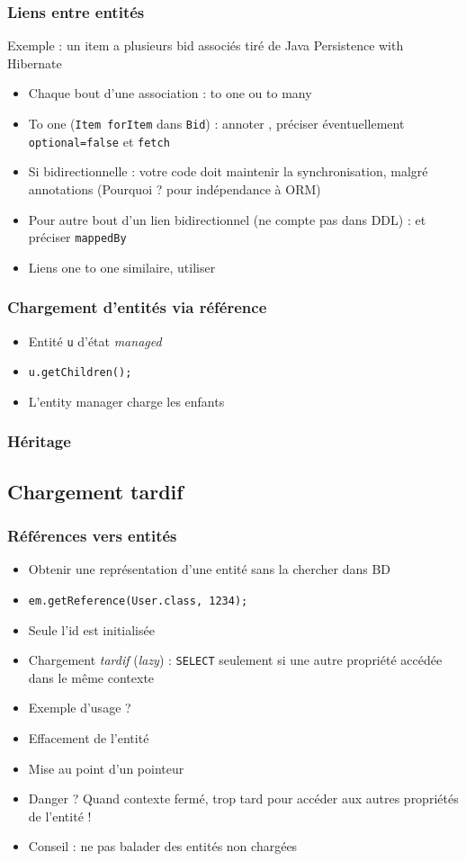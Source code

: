 \documentclass[english, french]{beamer}
\begin{document}
\begin{frame}
	\frametitle{Liens entre entités}
	Exemple : un item a plusieurs bid associés {\tiny tiré de Java Persistence with Hibernate}
	\begin{itemize}
		\item Chaque bout d’une association : to one ou to many
		\item To one (\texttt{Item forItem} dans \texttt{Bid}) : annoter , préciser éventuellement \texttt{optional=false} {\tiny et \texttt{fetch}}
		\item Si bidirectionnelle : votre code doit maintenir la synchronisation, malgré annotations (Pourquoi ? \pause pour indépendance à ORM)\pause
		\item Pour autre bout d’un lien bidirectionnel (ne compte pas dans DDL) :  et préciser \texttt{mappedBy}
		\item Liens one to one similaire, utiliser 
	\end{itemize}
\end{frame}

\begin{frame}
	\frametitle{Chargement d’entités via référence}
	\begin{itemize}
		\item Entité \texttt{u} d’état \emph{managed}
		\item \texttt{u.getChildren();}
		\item L’entity manager charge les enfants
	\end{itemize}
\end{frame}

\subsubsection{Héritage}%

\subsection{Chargement tardif}
\begin{frame}
	\frametitle{Références vers entités}
	\begin{itemize}
		\item Obtenir une représentation d’une entité sans la chercher dans BD
		\item \texttt{em.getReference(User.class, 1234);}
		\item Seule l’id est initialisée
		\item Chargement \emph{tardif} (\emph{lazy}) : \texttt{SELECT} seulement si une autre propriété accédée {\tiny dans le même contexte}
		\item Exemple d’usage ? \pause
		\item Effacement de l’entité
		\item Mise au point d’un pointeur \pause
		\item Danger ? \pause Quand contexte fermé, trop tard pour accéder aux autres propriétés de l’entité !
		\item Conseil : ne pas balader des entités non chargées
	\end{itemize}
\end{frame}
\end{document}
